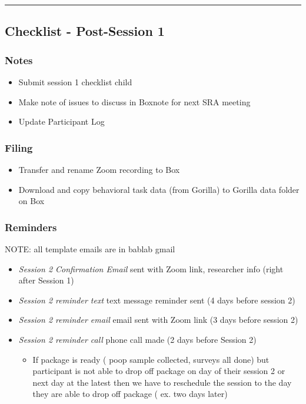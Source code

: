 \documentclass[]{book}
\providecommand{\tightlist}{%
  \setlength{\itemsep}{0pt}\setlength{\parskip}{0pt}}
\begin{document}
\begin{center}\rule{0.5\linewidth}{0.5pt}\end{center}

\hypertarget{checklist---post-session-1-2}{%
\subsection{Checklist - Post-Session 1}\label{checklist---post-session-1-2}}

\hypertarget{notes-3}{%
\subsubsection{Notes}\label{notes-3}}

\begin{itemize}
\tightlist
\item
  Submit session 1 checklist child
\item
  Make note of issues to discuss in Boxnote for next SRA meeting
\item
  Update Participant Log
\end{itemize}

\hypertarget{filing-8}{%
\subsubsection{Filing}\label{filing-8}}

\begin{itemize}
\tightlist
\item
  Transfer and rename Zoom recording to Box
\item
  Download and copy behavioral task data (from Gorilla) to Gorilla data folder on Box
\end{itemize}

\hypertarget{reminders-5}{%
\subsubsection{Reminders}\label{reminders-5}}

NOTE: all template emails are in bablab gmail

\begin{itemize}
\tightlist
\item
  \emph{Session 2 Confirmation Email} sent with Zoom link, researcher info (right after Session 1)
\item
  \emph{Session 2 reminder text} text message reminder sent (4 days before session 2)
\item
  \emph{Session 2 reminder email} email sent with Zoom link (3 days before session 2)
\item
  \emph{Session 2 reminder call} phone call made (2 days before Session 2)

  \begin{itemize}
  \tightlist
  \item
    If package is ready ( poop sample collected, surveys all done) but participant is not able to drop off package on day of their session 2 or next day at the latest then we have to reschedule the session to the day they are able to drop off package ( ex. two days later)
  \end{itemize}
\end{itemize}
\end{document}
